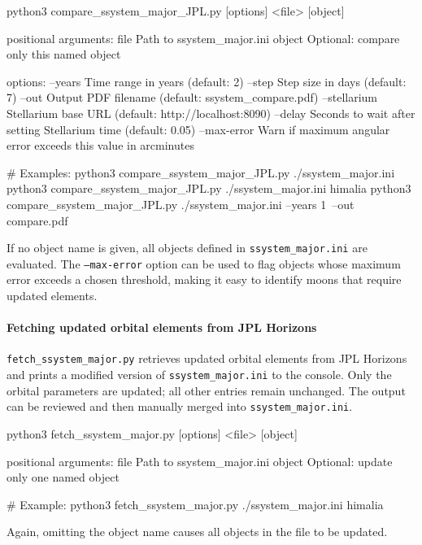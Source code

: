\begin{commands}
python3 compare_ssystem_major_JPL.py [options] <file> [object]

positional arguments:
  file        Path to ssystem_major.ini
  object      Optional: compare only this named object

options:
  --years     Time range in years (default: 2)
  --step      Step size in days (default: 7)
  --out       Output PDF filename (default: ssystem_compare.pdf)
  --stellarium  Stellarium base URL (default: http://localhost:8090)
  --delay     Seconds to wait after setting Stellarium time
              (default: 0.05)
  --max-error Warn if maximum angular error exceeds this value in
              arcminutes

# Examples:
python3 compare_ssystem_major_JPL.py ./ssystem_major.ini
python3 compare_ssystem_major_JPL.py ./ssystem_major.ini himalia
python3 compare_ssystem_major_JPL.py ./ssystem_major.ini --years 1\
  --out compare.pdf
\end{commands}

If no object name is given, all objects defined in \texttt{ssystem\_major.ini} are
evaluated. The \texttt{--max-error} option can be used to flag objects whose maximum
error exceeds a chosen threshold, making it easy to identify moons that require updated
elements.

\paragraph{Fetching updated orbital elements from JPL Horizons}

\texttt{fetch\_ssystem\_major.py} retrieves updated orbital elements from JPL Horizons
and prints a modified version of \texttt{ssystem\_major.ini} to the console. Only the
orbital parameters are updated; all other entries remain unchanged. The output can be
reviewed and then manually merged into \texttt{ssystem\_major.ini}.

\begin{commands}
python3 fetch_ssystem_major.py [options] <file> [object]

positional arguments:
  file        Path to ssystem_major.ini
  object      Optional: update only one named object

# Example:
python3 fetch_ssystem_major.py ./ssystem_major.ini himalia
\end{commands}

Again, omitting the object name causes all objects in the file to be updated.

